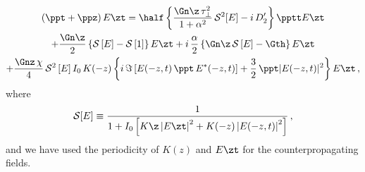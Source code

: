 \begin{multline} \label{eqn:mflt_ezt_unf}
    \left( \ppt + \ppz \right) E\zt = \half \left\{ \frac{\Gn\z\, \tau_\perp^2}{1 + \alpha^2}\, \mathcal{S}^2[E] - i\, D_2^\prime \right\} \pptt E\zt \\
    + \frac{\Gn\z}{2} \left\{ \mathcal{S}\left[E\right] - \mathcal{S}\left[1\right]\right\} E\zt
    + i\, \frac{\alpha}{2} \left\{ \Gn\z\, \mathcal{S}\left[E\right] - \Gth \right\} E\zt \\
    + \frac{\Gnz\, \chi}{4}\, \mathcal{S}^2\left[E\right] I_0\, K(-z)
    \left\{  i\, \Im\left[E(-z, t)\, \ppt\, E^\ast(-z, t)\right] + \frac{3}{2}\, \ppt |E(-z, t)|^2 \right\} E\zt\, ,
\end{multline}
where
\begin{equation}
    \mathcal{S}[E] \equiv \frac{1}{1 + I_0 \left[K\z \left|E\zt\right|^2 + K(-z) \left|E(-z, t)\right|^2\right]}\, ,
\end{equation}
and we have used the periodicity of $K(z)$ and $E\zt$ for the counterpropagating fields.

